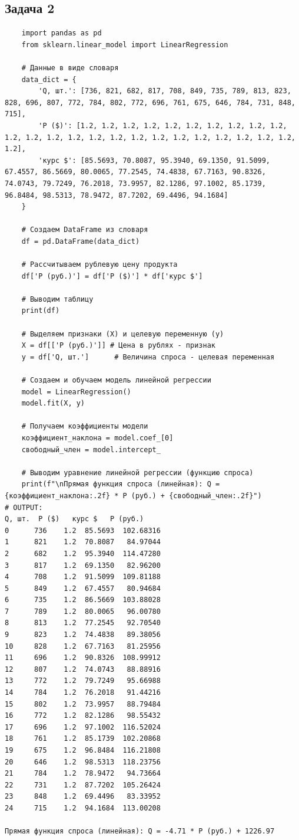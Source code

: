 \documentclass[a4paper,12pt]{article}
\begin{document}
\subsection{Задача 2}
\begin{verbatim}
    import pandas as pd
    from sklearn.linear_model import LinearRegression
    
    # Данные в виде словаря
    data_dict = {
        'Q, шт.': [736, 821, 682, 817, 708, 849, 735, 789, 813, 823, 828, 696, 807, 772, 784, 802, 772, 696, 761, 675, 646, 784, 731, 848, 715],
        'P ($)': [1.2, 1.2, 1.2, 1.2, 1.2, 1.2, 1.2, 1.2, 1.2, 1.2, 1.2, 1.2, 1.2, 1.2, 1.2, 1.2, 1.2, 1.2, 1.2, 1.2, 1.2, 1.2, 1.2, 1.2, 1.2],
        'курс $': [85.5693, 70.8087, 95.3940, 69.1350, 91.5099, 67.4557, 86.5669, 80.0065, 77.2545, 74.4838, 67.7163, 90.8326, 74.0743, 79.7249, 76.2018, 73.9957, 82.1286, 97.1002, 85.1739, 96.8484, 98.5313, 78.9472, 87.7202, 69.4496, 94.1684]
    }
    
    # Создаем DataFrame из словаря
    df = pd.DataFrame(data_dict)
    
    # Рассчитываем рублевую цену продукта
    df['Р (руб.)'] = df['P ($)'] * df['курс $']
    
    # Выводим таблицу
    print(df)
    
    # Выделяем признаки (X) и целевую переменную (y)
    X = df[['Р (руб.)']] # Цена в рублях - признак
    y = df['Q, шт.']      # Величина спроса - целевая переменная
    
    # Создаем и обучаем модель линейной регрессии
    model = LinearRegression()
    model.fit(X, y)
    
    # Получаем коэффициенты модели
    коэффициент_наклона = model.coef_[0]
    свободный_член = model.intercept_
    
    # Выводим уравнение линейной регрессии (функцию спроса)
    print(f"\nПрямая функция спроса (линейная): Q = {коэффициент_наклона:.2f} * P (руб.) + {свободный_член:.2f}")
# OUTPUT:
Q, шт.  P ($)   курс $   Р (руб.)
0      736    1.2  85.5693  102.68316
1      821    1.2  70.8087   84.97044
2      682    1.2  95.3940  114.47280
3      817    1.2  69.1350   82.96200
4      708    1.2  91.5099  109.81188
5      849    1.2  67.4557   80.94684
6      735    1.2  86.5669  103.88028
7      789    1.2  80.0065   96.00780
8      813    1.2  77.2545   92.70540
9      823    1.2  74.4838   89.38056
10     828    1.2  67.7163   81.25956
11     696    1.2  90.8326  108.99912
12     807    1.2  74.0743   88.88916
13     772    1.2  79.7249   95.66988
14     784    1.2  76.2018   91.44216
15     802    1.2  73.9957   88.79484
16     772    1.2  82.1286   98.55432
17     696    1.2  97.1002  116.52024
18     761    1.2  85.1739  102.20868
19     675    1.2  96.8484  116.21808
20     646    1.2  98.5313  118.23756
21     784    1.2  78.9472   94.73664
22     731    1.2  87.7202  105.26424
23     848    1.2  69.4496   83.33952
24     715    1.2  94.1684  113.00208

Прямая функция спроса (линейная): Q = -4.71 * P (руб.) + 1226.97
\end{verbatim}
\end{document}
